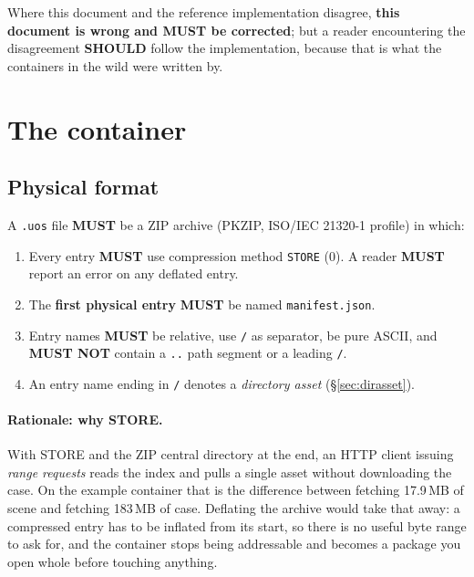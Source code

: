 \documentclass[11pt,a4paper]{article}
\newcommand{\MUST}{\textcolor{uosred}{\textbf{MUST}}}
\newcommand{\MUSTNOT}{\textcolor{uosred}{\textbf{MUST NOT}}}
\newcommand{\SHOULD}{\textcolor{uosamber}{\textbf{SHOULD}}}
\newcommand{\code}[1]{\texttt{\small #1}}
\begin{document}
Where this document and the reference implementation disagree, \textbf{this document is
wrong and \MUST{} be corrected}; but a reader encountering the disagreement \SHOULD{}
follow the implementation, because that is what the containers in the wild were written
by.

\newpage
\section{The container}\label{sec:container}

\subsection{Physical format}

A \code{.uos} file \MUST{} be a ZIP archive (PKZIP, ISO/IEC 21320-1 profile) in which:

\begin{enumerate}
  \item Every entry \MUST{} use compression method \code{STORE} (0). A reader \MUST{}
  report an error on any deflated entry.
  \item The \textbf{first physical entry} \MUST{} be named \code{manifest.json}.
  \item Entry names \MUST{} be relative, use \code{/} as separator, be pure ASCII, and
  \MUSTNOT{} contain a \code{..} path segment or a leading \code{/}.
  \item An entry name ending in \code{/} denotes a \emph{directory asset} (\S\ref{sec:dirasset}).
\end{enumerate}

\paragraph{Rationale: why STORE.} With STORE and the ZIP central directory at the end,
an HTTP client issuing \emph{range requests} reads the index and pulls a single asset
without downloading the case. On the example container that is the difference between
fetching 17.9\,MB of scene and fetching 183\,MB of case. Deflating the archive would take
that away: a compressed entry has to be inflated from its start, so there is no useful
byte range to ask for, and the container stops being addressable and becomes a package you
open whole before touching anything.
\end{document}
